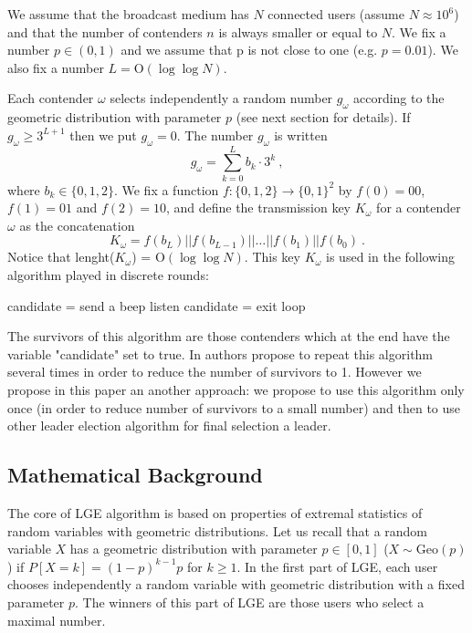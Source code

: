\documentclass[proceedings]{dmtcs}
\newcommand{\Geo}[1]{\mathrm{Geo}(#1)}
\newcommand{\BigO}[1]{\mathrm{O}\left(#1\right)}
\begin{document}
We assume that the broadcast medium has $N$ connected users (assume $N \approx 10^6$) and that
the number of contenders $n$ is always smaller or equal to $N$. 
We fix a number $p\in(0,1)$ and we assume that p is not close to one (e.g.
$p = 0.01$). We also fix a number $L = \BigO{\log \log N}$.

Each  contender $\omega$ selects independently a random number $g_\omega$ according to the geometric distribution with parameter $p$ (see next section for details). 
If $g_\omega \geq 3^{L+1}$ then we put $g_\omega = 0$. 
The number $g_\omega$ is written
\begin{equation}
\label{eq:base3exp}
  g_\omega = \sum_{k=0}^{L} b_k \cdot 3^k~, 
\end{equation}
where $b_k \in \{0,1,2\}$. We fix a function $f:\{0,1,2\}\to\{0,1\}^2$ by $f(0)=00$,
$f(1) = 01$ and $f(2)=10$, 
and define the transmission key $K_\omega$ for a contender $\omega$ as the concatenation
$$
  K_\omega = f(b_L) || f(b_{L-1}) || \ldots || f(b_1) || f(b_0) ~.
$$
Notice that lenght($K_\omega$) = $\BigO{\log\log N}$.
This key $K_\omega$ is used in the following algorithm played in discrete rounds:
\begin{algorithmic}[1]
\STATE candidate = \TRUE
{}
\STATE send a beep
\ELSE
	\STATE listen
		\STATE candidate = \FALSE
		\STATE exit loop
	\ENDIF
\ENDIF
\ENDFOR
\end{algorithmic}

The survivors of this algorithm are those contenders which at the end have the variable "candidate"
set to true. In \cite{DBLP:conf/mascots/JacquetMM13} authors propose to repeat this algorithm 
several times in order to reduce the number of survivors to 1. However we propose in this paper 
an another approach: we propose to use this algorithm only once (in order to reduce number 
of survivors to a small number) and then to use other leader election algorithm for final selection a leader.
 
\subsection{Mathematical Background}

The core of LGE algorithm is based on properties of extremal statistics 
of random variables with geometric distributions.  
Let us recall that a random variable $X$ has a geometric distribution 
with parameter $p \in [0,1]$ ($X \sim \Geo{p}$)
if $P[X=k] = (1-p)^{k-1}p$ for $k\geq 1$. 
In the first part of LGE, each user chooses independently a random variable with geometric
distribution with a fixed parameter $p$. The winners of this part of LGE are those users who select
a maximal number.  
\end{document}
